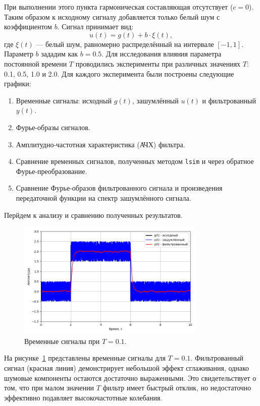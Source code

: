 \documentclass[a4paper]{article}
\begin{document}
При выполнении этого пункта гармоническая составляющая отсутствует (\(c=0\)). Таким образом к исходному сигналу добавляется только белый шум с коэффициентом $b$. Сигнал принимает вид:
\[u(t) = g(t) + b \cdot \xi(t),\]
где $\xi(t)$ --- белый шум, равномерно распределённый на интервале $[-1,1]$. Параметр $b$ зададим как $b = 0.5$. Для исследования влияния параметра постоянной времени \(T\) проводились эксперименты при различных значениях \(T\): 0.1, 0.5, 1.0 и 2.0. Для каждого эксперимента были построены следующие графики:
\begin{enumerate}
    \item Временные сигналы: исходный \(g(t)\), зашумлённый \(u(t)\) и фильтрованный \(y(t)\).
    \item Фурье-образы сигналов.
    \item Амплитудно-частотная характеристика (АЧХ) фильтра.
    \item Сравнение временных сигналов, полученных методом \texttt{lsim} и через обратное Фурье-преобразование.
    \item Сравнение Фурье-образов фильтрованного сигнала и произведения передаточной функции на спектр зашумлённого сигнала.
\end{enumerate}

Перйдем к анализу и сравнению полученных результатов.
\begin{figure}[H]
    \centering
    \includegraphics[width=0.8\textwidth]{src/task_1_1/time_2.0_0.1.png}
    \caption{Временные сигналы при \(T=0.1\).}
    \label{fig:time_0.1}
  \end{figure}
\noindent На рисунке~\ref{fig:time_0.1} представлены временные сигналы для \(T=0.1\). Фильтрованный сигнал (красная линия) демонстрирует небольшой эффект сглаживания, однако шумовые компоненты остаются достаточно выраженными. Это свидетельствует о том, что при малом значении \(T\) фильтр имеет быстрый отклик, но недостаточно эффективно подавляет высокочастотные колебания.
\end{document}
